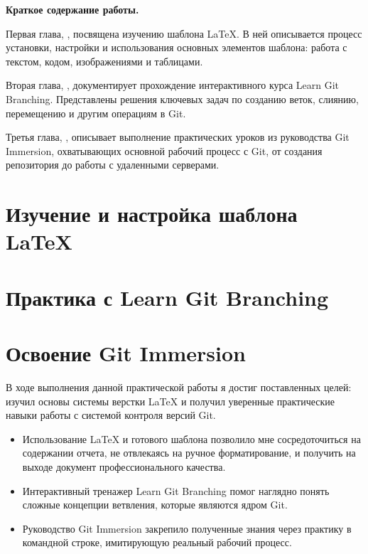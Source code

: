 \documentclass[a4paper,12pt]{report}
\begin{document}
    \textbf{Краткое содержание работы.}

    Первая глава, , посвящена изучению шаблона \LaTeX{}.
    В ней описывается процесс установки, настройки и использования основных элементов шаблона: работа с текстом, кодом, изображениями и таблицами.

    Вторая глава, , документирует прохождение интерактивного курса Learn Git Branching.
    Представлены решения ключевых задач по созданию веток, слиянию, перемещению и другим операциям в Git.

    Третья глава, , описывает выполнение практических уроков из руководства Git Immersion, охватывающих основной рабочий процесс с Git, от создания репозитория до работы с удаленными серверами.




    \chapter{Изучение и настройка шаблона \LaTeX{}}\label{ch:latex_chapter_title}

    




    \chapter{Практика с Learn Git Branching}\label{ch:git_branching_chapter_title}

    




    \chapter{Освоение Git Immersion}\label{ch:git_immersion_chapter_title}

    



    В ходе выполнения данной практической работы я достиг поставленных целей: изучил основы системы верстки \LaTeX{} и получил уверенные практические навыки работы с системой контроля версий Git.

    \begin{itemize}
        \item Использование \LaTeX{} и готового шаблона позволило мне сосредоточиться на содержании отчета, не отвлекаясь на ручное форматирование, и получить на выходе документ профессионального качества.
        \item Интерактивный тренажер Learn Git Branching помог наглядно понять сложные концепции ветвления, которые являются ядром Git.
        \item Руководство Git Immersion закрепило полученные знания через практику в командной строке, имитирующую реальный рабочий процесс.
    \end{itemize}
\end{document}
